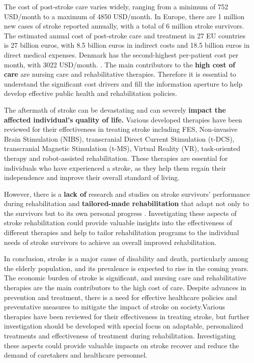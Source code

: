 The cost of post-stroke care varies widely, ranging from a minimum of 752 USD/month to a maximum of 4850 USD/month. In Europe, there are 1 million new cases of stroke reported annually, with a total of 6 million stroke survivors. The estimated annual cost of post-stroke care and treatment in 27 EU countries is 27 billion euros, with 8.5 billion euros in indirect costs and 18.5 billion euros in direct medical expenses. Denmark has the second-highest per-patient cost per month, with 3022 USD/month. \cite{Rochmah2021}.  The main contributors to the \textbf{high cost of care} are nursing care and rehabilitative therapies. Therefore it is essential to understand the significant cost drivers and fill the information aperture to help develop effective public health and rehabilitation policies. 

The aftermath of stroke can be devastating and can severely \textbf{impact the affected individual's quality of life.} Various developed therapies have been reviewed for their effectiveness in treating stroke including FES, Non-invasive Brain Stimulation (NIBS), transcranial Direct Current Stimulation (t-DCS), transcranial Magnetic Stimulation (t-MS), Virtual Reality (VR), task-oriented therapy and robot-assisted rehabilitation. These therapies are essential for individuals who have experienced a stroke, as they help them regain their independence and improve their overall standard of living.

However, there is a \textbf{lack of} research and studies on stroke survivors' performance during rehabilitation and \textbf{tailored-made rehabilitation} that adapt not only to the survivors but to its own personal progress \cite{Ismail2018}. Investigating these aspects of stroke rehabilitation could provide valuable insights into the effectiveness of different therapies and help to tailor rehabilitation programs to the individual needs of stroke survivors to achieve an overall improved rehabilitation.

In conclusion, stroke is a major cause of disability and death, particularly among the elderly population, and its prevalence is expected to rise in the coming years. The economic burden of stroke is significant, and nursing care and rehabilitative therapies are the main contributors to the high cost of care. Despite advances in prevention and treatment, there is a need for effective healthcare policies and preventative measures to mitigate the impact of stroke on society.Various therapies have been reviewed for their effectiveness in treating stroke, but further investigation should be developed with special focus on adaptable, personalized treatments and effectiveness of treatment during rehabilitation. Investigating these aspects could provide valuable impacts on stroke recover and reduce the demand of caretakers and healthcare personnel. 


